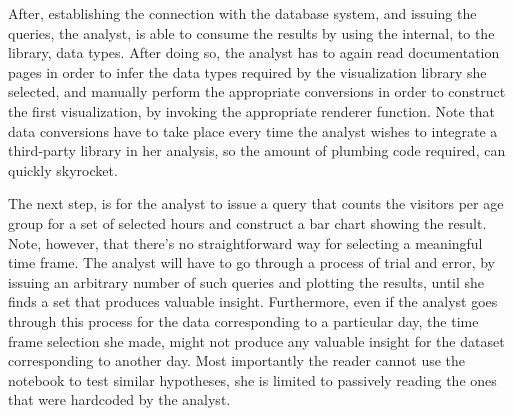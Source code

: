  
After, establishing the connection with the database system, and issuing the queries, the analyst, is able to consume the results by using the internal, to the library, data types. After doing so, the analyst has to again read documentation pages in order to infer the data types required by the visualization library she selected, and manually perform the appropriate conversions in order to construct the first visualization, by invoking the appropriate renderer function. Note that data conversions have to take place every time the analyst wishes to integrate a third-party library in her analysis, so the amount of plumbing code required, can quickly skyrocket.


The next step, is for the analyst to issue a query that counts the visitors per age group for a set of selected hours and construct a bar chart showing the result. Note, however, that there's no straightforward way for selecting a meaningful time frame. The analyst will have to go through a process of trial and error, by issuing an arbitrary number of such queries and plotting the results, until she finds a set that produces valuable insight. Furthermore, even if the analyst goes through this process for the data corresponding to a particular day, the time frame selection she made, might not produce any valuable insight for the dataset corresponding to another day. Most importantly the reader cannot use the notebook to test similar hypotheses, she is limited to passively reading the ones that were hardcoded by the analyst. 


